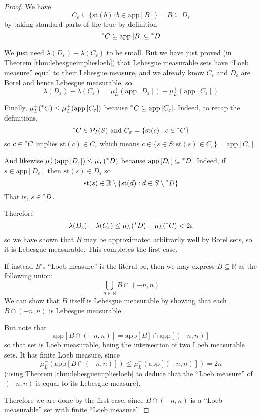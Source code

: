 \documentclass[11pt]{amsart}
\theoremstyle{remark}
\newcommand{\st}{\mathrm{st}}
\newcommand{\app}[1]{\mathrm{app}\left[#1\right]}
\newcommand{\hyp}[1][\mathbb{R}]{\prescript{*}{}{#1}}
\newcommand{\powerset}{\mathcal{P}}
\begin{document}
\begin{proof}
We have $$C_{\varepsilon} \subseteq \{ \st(b) : b \in \app{B} \} = B \subseteq D_{\varepsilon}$$
by taking standard parts of the true-by-definition $$\hyp[C] \subseteq \app{B} \subseteq \hyp[D]$$

We just need $\lambda(D_{\varepsilon}) - \lambda(C_{\varepsilon})$ to be small.
But we have just proved (in Theorem \ref{thm:lebesgueimpliesloeb}) that Lebesgue measurable sets have ``Loeb measure'' equal to their Lebesgue measure, and we already know $C_{\varepsilon}$ and $D_{\varepsilon}$ are Borel and hence Lebesgue measurable,
so $$\lambda(D_{\varepsilon}) - \lambda(C_{\varepsilon}) = \mu_L^+(\app{D_{\varepsilon}}) - \mu_L^+(\app{C_{\varepsilon}})$$

Finally, $\mu_L^+(\hyp[C]) \leq \mu_L^+(\app{C_{\varepsilon}})$ because $\hyp[C] \subseteq \app{C_{\varepsilon}}$.
Indeed, to recap the definitions, $$\text{$\hyp[C] \in \powerset_I(S)$ and $C_{\varepsilon} = \{ \st(c) : c \in \hyp[C] \}$}$$
so $c \in \hyp[C]$ implies $\st(c) \in C_{\varepsilon}$ which means $c \in \{s \in S: \st(s) \in C_{\varepsilon} \} = \app{C_{\varepsilon}}$.

And likewise $\mu_L^+(\app{D_{\varepsilon}}) \leq \mu_L^+(\hyp[D])$ because $\app{D_{\varepsilon}} \subseteq \hyp[D]$.
Indeed, if $s \in \app{D_{\varepsilon}}$ then $\st(s) \in D_{\varepsilon}$ so $$\st(s) \in \mathbb{R} \setminus \{ \st(d) : d \in S \setminus \hyp[D]\}$$
That is, $s \in \hyp[D]$.

Therefore $$\lambda(D_{\varepsilon}) - \lambda(C_{\varepsilon}) \leq \mu_L(\hyp[D]) - \mu_L(\hyp[C]) < 2 \varepsilon$$
so we have shown that $B$ may be approximated arbitrarily well by Borel sets, so it is Lebesgue measurable.
This completes the first case.

If instead $B$'s ``Loeb measure'' is the literal $\infty$, then we may express $B \subseteq \mathbb{R}$ as the following union:
$$\bigcup_{n \in \mathbb{N}} B \cap (-n, n)$$
We can show that $B$ itself is Lebesgue measurable by showing that each $B \cap (-n, n)$ is Lebesgue measurable.

But note that $$\app{B \cap (-n, n)} = \app{B} \cap \app{(-n, n)}$$
so that set is Loeb measurable, being the intersection of two Loeb measurable sets.
It has finite Loeb measure, since $$\mu_L^+(\app{B \cap (-n, n)}) \leq \mu_L^+(\app{(-n, n)}) = 2n$$
(using Theorem \ref{thm:lebesgueimpliesloeb} to deduce that the ``Loeb measure'' of $(-n, n)$ is equal to its Lebesgue measure).

Therefore we are done by the first case, since $B \cap (-n, n)$ is a ``Loeb measurable'' set with finite ``Loeb measure''.
\end{proof}
\end{document}
